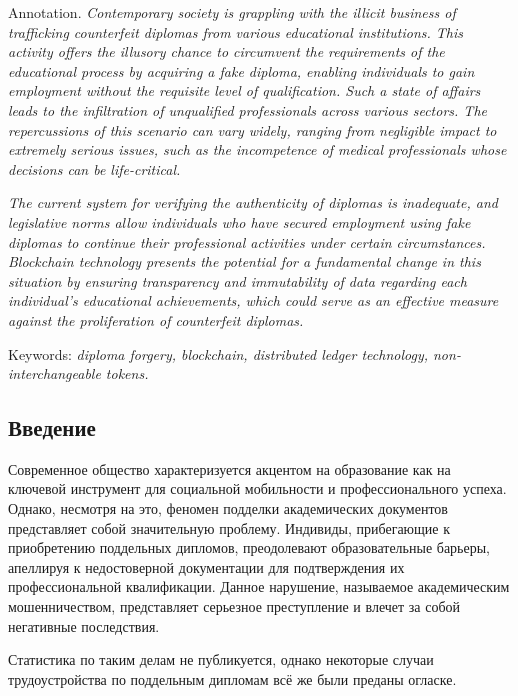 \documentclass{mirea-article}
\begin{document}
Annotation. \textit{Contemporary society is grappling with the illicit business of trafficking counterfeit diplomas from various educational institutions. This activity offers the illusory chance to circumvent the requirements of the educational process by acquiring a fake diploma, enabling individuals to gain employment without the requisite level of qualification. Such a state of affairs leads to the infiltration of unqualified professionals across various sectors. The repercussions of this scenario can vary widely, ranging from negligible impact to extremely serious issues, such as the incompetence of medical professionals whose decisions can be life-critical.}

\textit{The current system for verifying the authenticity of diplomas is inadequate, and legislative norms allow individuals who have secured employment using fake diplomas to continue their professional activities under certain circumstances. Blockchain technology presents the potential for a fundamental change in this situation by ensuring transparency and immutability of data regarding each individual's educational achievements, which could serve as an effective measure against the proliferation of counterfeit diplomas.}

Keywords: \textit{diploma forgery, blockchain, distributed ledger technology, non-interchangeable tokens.}

\subsection*{Введение}
\label{sec:introduction}

Современное общество характеризуется акцентом на образование как на ключевой инструмент для социальной мобильности и профессионального успеха. Однако, несмотря на это, феномен подделки академических документов представляет собой значительную проблему. Индивиды, прибегающие к приобретению поддельных дипломов, преодолевают образовательные барьеры, апеллируя к недостоверной документации для подтверждения их профессиональной квалификации. Данное нарушение, называемое академическим мошенничеством, представляет серьезное преступление и влечет за собой негативные последствия.

Статистика по таким делам не публикуется, однако некоторые случаи трудоустройства по поддельным дипломам всё же были преданы огласке. ~\cite{bib:korochka-ne-glavnoe, bib:nursing-diploma-scheme}
\end{document}
